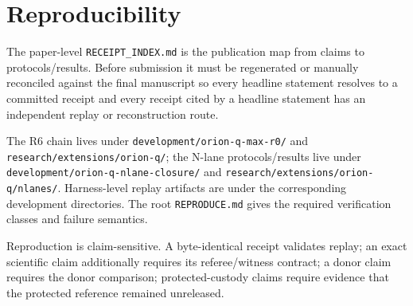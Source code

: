\section{Reproducibility}

The paper-level \texttt{RECEIPT_INDEX.md} is the publication map from claims to protocols/results. Before submission it must be regenerated or manually reconciled against the final manuscript so every headline statement resolves to a committed receipt and every receipt cited by a headline statement has an independent replay or reconstruction route.

The R6 chain lives under \texttt{development/orion-q-max-r0/} and \texttt{research/extensions/orion-q/}; the N-lane protocols/results live under \texttt{development/orion-q-nlane-closure/} and \texttt{research/extensions/orion-q/nlanes/}. Harness-level replay artifacts are under the corresponding development directories. The root \texttt{REPRODUCE.md} gives the required verification classes and failure semantics.

Reproduction is claim-sensitive. A byte-identical receipt validates replay; an exact scientific claim additionally requires its referee/witness contract; a donor claim requires the donor comparison; protected-custody claims require evidence that the protected reference remained unreleased.
